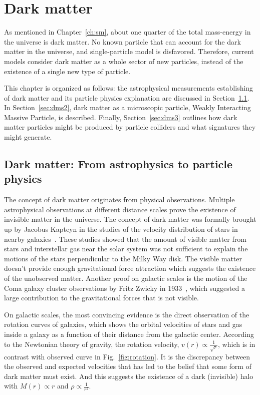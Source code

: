 \chapter{Dark matter}
\label{ch:dm}
\par As mentioned in Chapter~\ref{ch:sm}, about one quarter of the total mass-energy in the universe is dark matter. No known particle that can account for the dark matter in the universe, and single-particle model is disfavored. Therefore, current models consider dark matter as a whole sector of new particles, instead of the existence of a single new type of particle.

\par This chapter is organized as follows: the astrophysical measurements establishing of dark matter and its particle physics explanation are discussed in Section~\ref{sec:dms1}. In Section~\ref{sec:dms2}, dark matter as a microscopic particle, Weakly Interacting Massive Particle, is described. Finally, Section~\ref{sec:dms3} outlines how dark matter particles might be produced by particle colliders and what signatures they might generate.

\section{Dark matter: From astrophysics to particle physics}
\label{sec:dms1}

\par The concept of dark matter originates from physical observations. Multiple astrophysical observations at different distance scales prove the existence of invisible matter in the universe. The concept of dark matter was formally brought up by Jacobus Kapteyn in the studies of the velocity distribution of stars in nearby galaxies~\cite{Kapteyn:1922zz}. These studies showed that the amount of visible matter from stars and interstellar gas near the solar system was not sufficient to explain the motions of the stars perpendicular to the Milky Way disk. The visible matter doesn't provide enough gravitational force attraction which suggests the existence of the unobserved matter. Another proof on galactic scales is the motion of the Coma galaxy cluster observations by Fritz Zwicky in 1933~\cite{Zwicky:1933gu}, which suggested a large contribution to the gravitational forces that is not visible.

\par On galactic scales, the most convincing evidence is the direct observation of the rotation curves of galaxies, which shows the orbital velocities of stars and gas inside a galaxy as a function of their distance from the galactic center. According to the Newtonian theory of gravity, the rotation velocity, $v(r) \propto \frac{1}{\sqrt{r}}$, which is in contrast with observed curve in Fig.~\ref{fig:rotation}. It is the discrepancy between the observed and expected velocities that has led to the belief that some form of dark matter must exist. And this suggests the existence of a dark (invisible) halo with $M(r) \propto r$ and $\rho \propto \frac{1}{r^2}$.

